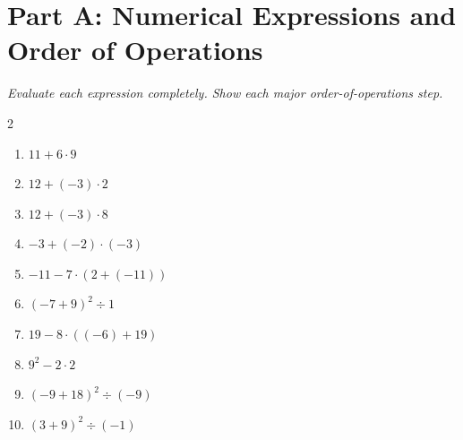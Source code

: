 \documentclass[11pt]{article}
\begin{document}
\section*{Part A: Numerical Expressions and Order of Operations}
\noindent\textit{Evaluate each expression completely. Show each major order-of-operations step.}
\begin{multicols}{2}
\begin{enumerate}
  \item $11 + 6 \cdot 9$
  \vspace{1.1cm}
  \item $12 + (-3) \cdot 2$
  \vspace{1.1cm}
  \item $12 + (-3) \cdot 8$
  \vspace{1.1cm}
  \item $-3 + (-2) \cdot (-3)$
  \vspace{1.1cm}
  \item $-11 - 7 \cdot (2 + (-11))$
  \vspace{1.1cm}
  \item $(-7 + 9)^{2} \div 1$
  \vspace{1.1cm}
  \item $19 - 8 \cdot ((-6) + 19)$
  \vspace{1.1cm}
  \item $9^{2} - 2 \cdot 2$
  \vspace{1.1cm}
  \item $(-9 + 18)^{2} \div (-9)$
  \vspace{1.1cm}
  \item $(3 + 9)^{2} \div (-1)$
  \vspace{1.1cm}
\end{enumerate}
\end{multicols}
\end{document}
